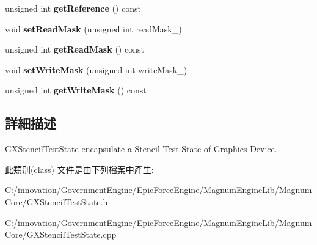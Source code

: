 \begin{DoxyCompactItemize}
\item 
unsigned int {\bfseries get\+Reference} () const \hypertarget{class_i_dream_sky_1_1_g_x_stencil_test_state_aebb188eb78c560c8f07ce5fde341796f}{}\label{class_i_dream_sky_1_1_g_x_stencil_test_state_aebb188eb78c560c8f07ce5fde341796f}

\item 
void {\bfseries set\+Read\+Mask} (unsigned int read\+Mask\+\_\+)\hypertarget{class_i_dream_sky_1_1_g_x_stencil_test_state_ad774d8dd5a8f330d2ce840cf08fa5241}{}\label{class_i_dream_sky_1_1_g_x_stencil_test_state_ad774d8dd5a8f330d2ce840cf08fa5241}

\item 
unsigned int {\bfseries get\+Read\+Mask} () const \hypertarget{class_i_dream_sky_1_1_g_x_stencil_test_state_a34bece65bef024ba90cb6298c978858f}{}\label{class_i_dream_sky_1_1_g_x_stencil_test_state_a34bece65bef024ba90cb6298c978858f}

\item 
void {\bfseries set\+Write\+Mask} (unsigned int write\+Mask\+\_\+)\hypertarget{class_i_dream_sky_1_1_g_x_stencil_test_state_a7371703148fc6c36ac9617d25fc5201c}{}\label{class_i_dream_sky_1_1_g_x_stencil_test_state_a7371703148fc6c36ac9617d25fc5201c}

\item 
unsigned int {\bfseries get\+Write\+Mask} () const \hypertarget{class_i_dream_sky_1_1_g_x_stencil_test_state_a7092ce6eca9d615d2fef19c825088175}{}\label{class_i_dream_sky_1_1_g_x_stencil_test_state_a7092ce6eca9d615d2fef19c825088175}

\end{DoxyCompactItemize}


\subsection{詳細描述}
\hyperlink{class_i_dream_sky_1_1_g_x_stencil_test_state}{G\+X\+Stencil\+Test\+State} encapsulate a Stencil Test \hyperlink{class_i_dream_sky_1_1_state}{State} of Graphics Device. 

此類別(class) 文件是由下列檔案中產生\+:\begin{DoxyCompactItemize}
\item 
C\+:/innovation/\+Government\+Engine/\+Epic\+Force\+Engine/\+Magnum\+Engine\+Lib/\+Magnum\+Core/G\+X\+Stencil\+Test\+State.\+h\item 
C\+:/innovation/\+Government\+Engine/\+Epic\+Force\+Engine/\+Magnum\+Engine\+Lib/\+Magnum\+Core/G\+X\+Stencil\+Test\+State.\+cpp\end{DoxyCompactItemize}
